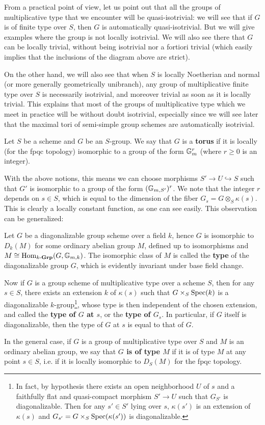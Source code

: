 From a practical point of view, let us point out that all the groups of multiplicative type that we encounter will be quasi-isotrivial: we will see that if $G$ is of finite type over $S$, then $G$ is automatically quasi-isotrivial. But we will give examples where the group is not locally isotrivial. We will also see there that $G$ can be locally trivial, without being isotrivial nor a fortiori trivial (which easily implies that the inclusions of the diagram above are strict).\par
On the other hand, we will also see that when $S$ is locally Noetherian and normal (or more generally geometrically unibranch), any group of multiplicative finite type over $S$ is necessarily isotrivial, and moreover trivial as soon as it is locally trivial. This explains that most of the groups of multiplicative type which we meet in practice will be without doubt isotrivial, especially since we will see later that the maximal tori of semi-simple group schemes are automatically isotrivial.

\begin{definition}
Let $S$ be a scheme and $G$ be an $S$-group. We say that $G$ is a \textbf{torus} if it is locally (for the fpqc topology) isomorphic to a group of the form $\mathbb{G}_m^r$ (where $r\geq 0$ is an integer).
\end{definition}
With the above notions, this means we can choose morphisms $S'\to U\hookrightarrow S$ such that $G'$ is isomorphic to a group of the form $(\mathbb{G}_{m,S'})^r$. We note that the integer $r$ depends on $s\in S$, which is equal to the dimension of the fiber $G_s=G\otimes_S\kappa(s)$. This is clearly a locally constant function, as one can see easily. This observation can be generalized:

\begin{definition}
Let $G$ be a diagonalizable group scheme over a field $k$, hence $G$ is isomorphic to $D_k(M)$ for some ordinary abelian group $M$, defined up to isomorphisms and $M\cong\mathrm{Hom}_{k\textup{-}\mathbf{Grp}}(G,\mathbb{G}_{m,k})$. The isomorphic class of $M$ is called the \textbf{type} of the diagonalizable group $G$, which is evidently invariant under base field change.
\end{definition}

Now if $G$ is a group scheme of multiplicative type over a scheme $S$, then for any $s\in S$, there exists an extension $k$ of $\kappa(s)$ such that $G\times_S\mathrm{Spec}(k)$ is a diagonalizable $k$-group\footnote{In fact, by hypothesis there exists an open neighborhood $U$ of $s$ and a faithfully flat and quasi-compact morphism $S'\to U$ such that $G_{S'}$ is diagonalizable. Then for any $s'\in S'$ lying over $s$, $\kappa(s')$ is an extension of $\kappa(s)$ and $G_{s'}=G\times_S\mathrm{Spec}(\kappa(s'))$ is diagonalizable.}, whose type is then independent of the chosen extension, and called the \textbf{type of $G$ at $s$}, or the \textbf{type of $G_s$}. In particular, if $G$ itself is diagonalizable, then the type of $G$ at $s$ is equal to that of $G$.\par
In the general case, if $G$ is a group of multiplicative type over $S$ and $M$ is an ordinary abelian group, we say that \textbf{$G$ is of type $M$} if it is of type $M$ at any point $s\in S$, i.e. if it is locally isomorphic to $D_S(M)$ for the fpqc topology.

